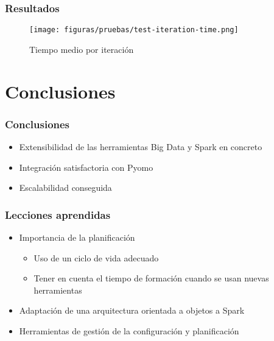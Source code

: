 \documentclass{beamer}
\begin{document}
\begin{frame}[plain]
    \frametitle{Resultados}
    \begin{figure}[H]
        \centerline{\texttt{[image: figuras/pruebas/test-iteration-time.png]}}
        \caption{Tiempo medio por iteración}
        \label{fig:test-iteration-time}
    \end{figure}
\end{frame}

\section{Conclusiones}

\begin{frame}{}
    \frametitle{Conclusiones}
    \begin{itemize}
        \item Extensibilidad de las herramientas Big Data y Spark en concreto \pause
        \item Integración satisfactoria con Pyomo \pause
        \item Escalabilidad conseguida
    \end{itemize}
\end{frame}

\begin{frame}{}
    \frametitle{Lecciones aprendidas}
    \begin{itemize}
        \item Importancia de la planificación \pause
        \begin{itemize}
            \item Uso de un ciclo de vida adecuado
            \item Tener en cuenta el tiempo de formación cuando se usan nuevas herramientas \pause
        \end{itemize}
        \item Adaptación de una arquitectura orientada a objetos a Spark \pause
        \item Herramientas de gestión de la configuración y planificación \pause
    \end{itemize}
\end{frame}
\end{document}
